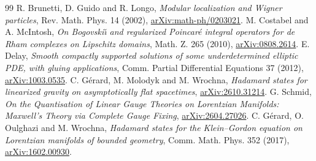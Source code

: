 \documentclass[11pt]{article}
\begin{document}
\begin{thebibliography}{99}
 R. Brunetti, D. Guido and R. Longo, \emph{Modular localization and Wigner particles}, Rev. Math. Phys. 14 (2002), \href{https://arxiv.org/abs/math-ph/0203021}{arXiv:math-ph/0203021}.
 M. Costabel and A. McIntosh, \emph{On Bogovski\v\i{} and regularized Poincar\'e integral operators for de Rham complexes on Lipschitz domains}, Math. Z. 265 (2010), \href{https://arxiv.org/abs/0808.2614}{arXiv:0808.2614}.
 E. Delay, \emph{Smooth compactly supported solutions of some underdetermined elliptic PDE, with gluing applications}, Comm. Partial Differential Equations 37 (2012), \href{https://arxiv.org/abs/1003.0535}{arXiv:1003.0535}.
 C. G\'erard, M. Molodyk and M. Wrochna, \emph{Hadamard states for linearized gravity on asymptotically flat spacetimes}, \href{https://arxiv.org/abs/2610.31214}{arXiv:2610.31214}.
 G. Schmid, \emph{On the Quantisation of Linear Gauge Theories on Lorentzian Manifolds: Maxwell's Theory via Complete Gauge Fixing}, \href{https://arxiv.org/abs/2604.27026}{arXiv:2604.27026}.
 C. G\'erard, O. Oulghazi and M. Wrochna, \emph{Hadamard states for the Klein--Gordon equation on Lorentzian manifolds of bounded geometry}, Comm. Math. Phys. 352 (2017), \href{https://arxiv.org/abs/1602.00930}{arXiv:1602.00930}.


\end{thebibliography}
\end{document}
